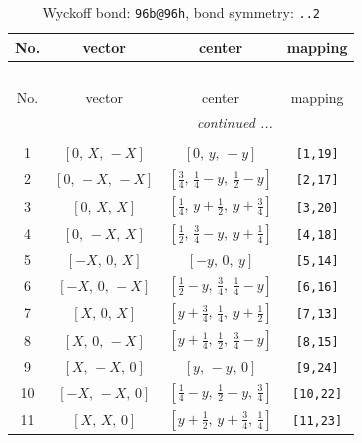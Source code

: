 \documentclass[fleqn,8pt]{jsarticle}
\begin{document}
\begin{longtable}{cccc}
\caption{Wyckoff bond: {\tt 96b@96h}, bond symmetry: {\tt ..2}}
 \\
 \hline \hline
No. & vector & center & mapping \\ \hline \endfirsthead

\multicolumn{3}{l}{\tablename\ \thetable{}} \\
 \hline \hline
No. & vector & center & mapping \\ \hline \endhead

 \hline \hline
\multicolumn{3}{r}{\footnotesize\it continued ...} \\ \endfoot

 \hline \hline
\multicolumn{3}{r}{} \\ \endlastfoot

1 & $\left[ 0,\, X,\, - X \right]$ & $\left[ 0,\, y,\, - y \right]$ & {\tt [1,19]} \\ \hline
2 & $\left[ 0,\, - X,\, - X \right]$ & $\left[ \frac{3}{4},\, \frac{1}{4} - y,\, \frac{1}{2} - y \right]$ & {\tt [2,17]} \\ \hline
3 & $\left[ 0,\, X,\, X \right]$ & $\left[ \frac{1}{4},\, y + \frac{1}{2},\, y + \frac{3}{4} \right]$ & {\tt [3,20]} \\ \hline
4 & $\left[ 0,\, - X,\, X \right]$ & $\left[ \frac{1}{2},\, \frac{3}{4} - y,\, y + \frac{1}{4} \right]$ & {\tt [4,18]} \\ \hline
5 & $\left[ - X,\, 0,\, X \right]$ & $\left[ - y,\, 0,\, y \right]$ & {\tt [5,14]} \\ \hline
6 & $\left[ - X,\, 0,\, - X \right]$ & $\left[ \frac{1}{2} - y,\, \frac{3}{4},\, \frac{1}{4} - y \right]$ & {\tt [6,16]} \\ \hline
7 & $\left[ X,\, 0,\, X \right]$ & $\left[ y + \frac{3}{4},\, \frac{1}{4},\, y + \frac{1}{2} \right]$ & {\tt [7,13]} \\ \hline
8 & $\left[ X,\, 0,\, - X \right]$ & $\left[ y + \frac{1}{4},\, \frac{1}{2},\, \frac{3}{4} - y \right]$ & {\tt [8,15]} \\ \hline
9 & $\left[ X,\, - X,\, 0 \right]$ & $\left[ y,\, - y,\, 0 \right]$ & {\tt [9,24]} \\ \hline
10 & $\left[ - X,\, - X,\, 0 \right]$ & $\left[ \frac{1}{4} - y,\, \frac{1}{2} - y,\, \frac{3}{4} \right]$ & {\tt [10,22]} \\ \hline
11 & $\left[ X,\, X,\, 0 \right]$ & $\left[ y + \frac{1}{2},\, y + \frac{3}{4},\, \frac{1}{4} \right]$ & {\tt [11,23]} \\ \hline

\end{longtable}
\end{document}

